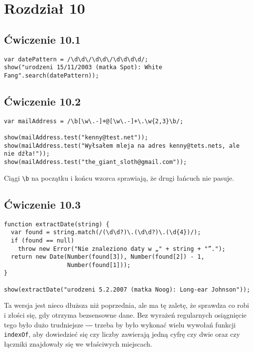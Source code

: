 \section*{Rozdział 10}
\label{sol:10}

\subsection*{Ćwiczenie 10.1}
\label{sol:10.1}
    
\begin{verbatim} 
var datePattern = /\d\d\/\d\d\/\d\d\d\d/;
show("urodzeni 15/11/2003 (matka Spot): White Fang".search(datePattern));
\end{verbatim}
 
  
\subsection*{Ćwiczenie 10.2}
\label{sol:10.2}
    
\begin{verbatim} 
var mailAddress = /\b[\w\.-]+@[\w\.-]+\.\w{2,3}\b/;

show(mailAddress.test("kenny@test.net"));
show(mailAddress.test("Wyłsałem mleja na adres kenny@tets.nets, ale nie dźła!"));
show(mailAddress.test("the_giant_sloth@gmail.com"));
 \end{verbatim}
    
Ciągi \texttt{\textbackslash b} na początku i końcu wzorca sprawiają, że drugi łańcuch nie pasuje.

  
\subsection*{Ćwiczenie 10.3}
\label{sol:10.3}
    
\begin{verbatim} 
function extractDate(string) {
  var found = string.match(/(\d\d?)\.(\d\d?)\.(\d{4})/);
  if (found == null)
    throw new Error("Nie znaleziono daty w „" + string + "”.");
  return new Date(Number(found[3]), Number(found[2]) - 1,
                  Number(found[1]));
}

show(extractDate("urodzeni 5.2.2007 (matka Noog): Long-ear Johnson"));
\end{verbatim}
    
Ta wersja jest nieco dłuższa niż poprzednia, ale ma tę zaletę, że sprawdza co robi i złości się, gdy otrzyma bezsensowne dane. Bez wyrażeń regularnych osiągnięcie tego było dużo trudniejsze ― trzeba by było wykonać wielu wywołań funkcji \texttt{indexOf}, aby dowiedzieć się czy liczby zawierają jedną cyfrę czy dwie oraz czy łączniki znajdowały się we właściwych miejscach.

